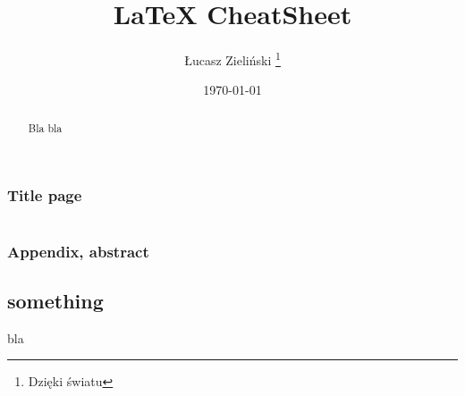 \subsection{Title page}
\begin{minipage}[t]{0.49\textwidth}
\begin{latex}
\title{\LaTeX{} CheatSheet}
\author{\L{}ucasz Zieli\'nski
 \thanks{Dzi\k{e}ki \'swiatu}}
\date{\today}
\begin{titlepage} 
 \maketitle 
\end{titlepage}
\end{latex}
\end{minipage}
\hfill
{}
\hfill
\(\)%

\subsection{Appendix, abstract}
\begin{latex}
\appendix
\chapter{something}
bla

\begin{abstract}
Bla bla
\end{abstract}
\end{latex}


